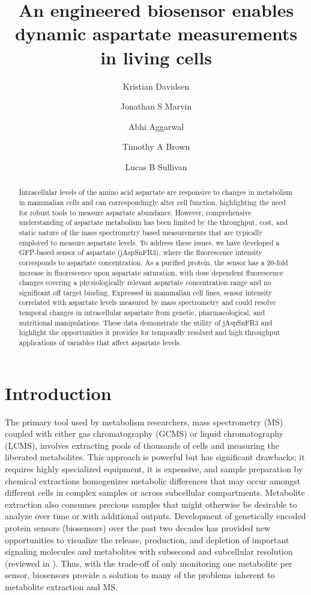 \documentclass[9pt,lineno]{elife}
\title{An engineered biosensor enables dynamic aspartate measurements in living cells}
\author[1,2,\authfn{1}]{Kristian Davidsen}
\author[3,\authfn{1}*]{Jonathan S Marvin}
\author[3]{Abhi Aggarwal}
\author[3]{Timothy A Brown}
\author[1*]{Lucas B Sullivan}
\affil[1]{Human Biology Division, Fred Hutchinson Cancer Center, Seattle, WA, USA}
\affil[2]{Molecular and cellular biology program, University of Washington, Seattle, WA, USA}
\affil[3]{Howard Hughes Medical Institute (HHMI), Janelia Research Campus, Ashburn, VA, USA}
\begin{document}
\maketitle

\begin{abstract}
Intracellular levels of the amino acid aspartate are responsive to changes in metabolism in mammalian cells and can correspondingly alter cell function, highlighting the need for robust tools to measure aspartate abundance.
However, comprehensive understanding of aspartate metabolism has been limited by the throughput, cost, and static nature of the mass spectrometry based measurements that are typically employed to measure aspartate levels.
To address these issues, we have developed a GFP-based sensor of aspartate (jAspSnFR3), where the fluorescence intensity corresponds to aspartate concentration.
As a purified protein, the sensor has a 20-fold increase in fluorescence upon aspartate saturation, with dose dependent fluorescence changes covering a physiologically relevant aspartate concentration range and no significant off target binding.
Expressed in mammalian cell lines, sensor intensity correlated with aspartate levels measured by mass spectrometry and could resolve temporal changes in intracellular aspartate from genetic, pharmacological, and nutritional manipulations.
These data demonstrate the utility of jAspSnFR3 and highlight the opportunities it provides for temporally resolved and high throughput applications of variables that affect aspartate levels.
\end{abstract}


\section{Introduction}
The primary tool used by metabolism researchers, mass spectrometry (MS) coupled with either gas chromatography (GCMS) or liquid chromatography (LCMS), involves extracting pools of thousands of cells and measuring the liberated metabolites.
This approach is powerful but has significant drawbacks; it requires highly specialized equipment, it is expensive, and sample preparation by chemical extractions homogenizes metabolic differences that may occur amongst different cells in complex samples or across subcellular compartments.
Metabolite extraction also consumes precious samples that might otherwise be desirable to analyze over time or with additional outputs.
Development of genetically encoded protein sensors (biosensors) over the past two decades has provided new opportunities to visualize the release, production, and depletion of important signaling molecules and metabolites with subsecond and subcellular resolution (reviewed in \cite{Kostyuk2019-qc, Koveal2020-cl}).
Thus, with the trade-off of only monitoring one metabolite per sensor, biosensors provide a solution to many of the problems inherent to metabolite extraction and MS.
\end{document}
